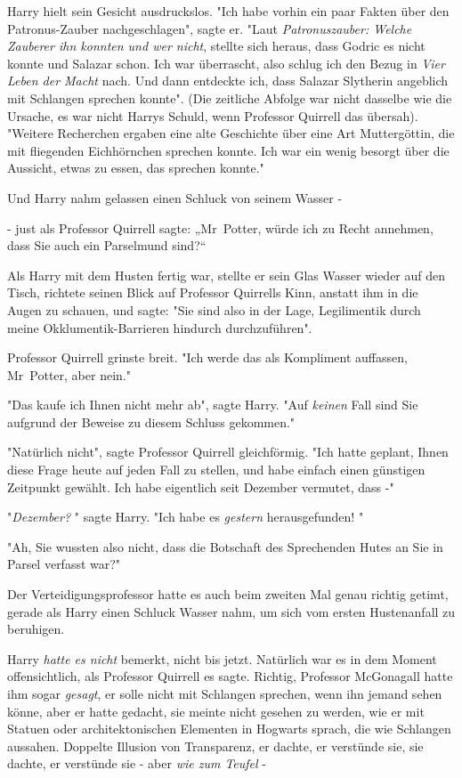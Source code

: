 {Harry hielt sein Gesicht ausdruckslos. "Ich habe vorhin ein paar Fakten über den Patronus-Zauber nachgeschlagen", sagte er. "Laut \emph{Patronuszauber: Welche Zauberer ihn konnten und wer nicht}, stellte sich heraus, dass Godric es nicht konnte und Salazar schon. Ich war überrascht, also schlug ich den Bezug in \emph{Vier Leben der Macht} nach. Und dann entdeckte ich, dass Salazar Slytherin angeblich mit Schlangen sprechen konnte". (Die zeitliche Abfolge war nicht dasselbe wie die Ursache, es war nicht Harrys Schuld, wenn Professor Quirrell das übersah). "Weitere Recherchen ergaben eine alte Geschichte über eine Art Muttergöttin, die mit fliegenden Eichhörnchen sprechen konnte. Ich war ein wenig besorgt über die Aussicht, etwas zu essen, das sprechen konnte."

Und Harry nahm gelassen einen Schluck von seinem Wasser -

- just als Professor Quirrell sagte: „Mr~Potter, würde ich zu Recht annehmen, dass Sie auch ein Parselmund sind?“

Als Harry mit dem Husten fertig war, stellte er sein Glas Wasser wieder auf den Tisch, richtete seinen Blick auf Professor Quirrells Kinn, anstatt ihm in die Augen zu schauen, und sagte: "Sie sind also in der Lage, Legilimentik durch meine Okklumentik-Barrieren hindurch durchzuführen".

Professor Quirrell grinste breit. "Ich werde das als Kompliment auffassen, Mr~Potter, aber nein."

"Das kaufe ich Ihnen nicht mehr ab", sagte Harry. "Auf \emph{keinen} Fall sind Sie aufgrund der Beweise zu diesem Schluss gekommen."

"Natürlich nicht", sagte Professor Quirrell gleichförmig. "Ich hatte geplant, Ihnen diese Frage heute auf jeden Fall zu stellen, und habe einfach einen günstigen Zeitpunkt gewählt. Ich habe eigentlich seit Dezember vermutet, dass -"

"\emph{Dezember?} " sagte Harry. "Ich habe es \emph{gestern} herausgefunden! "

"Ah, Sie wussten also nicht, dass die Botschaft des Sprechenden Hutes an Sie in Parsel verfasst war?"

Der Verteidigungsprofessor hatte es auch beim zweiten Mal genau richtig getimt, gerade als Harry einen Schluck Wasser nahm, um sich vom ersten Hustenanfall zu beruhigen.

Harry \emph{hatte es nicht} bemerkt, nicht bis jetzt. Natürlich war es in dem Moment offensichtlich, als Professor Quirrell es sagte. Richtig, Professor McGonagall hatte ihm sogar \emph{gesagt}, er solle nicht mit Schlangen sprechen, wenn ihn jemand sehen könne, aber er hatte gedacht, sie meinte nicht gesehen zu werden, wie er mit Statuen oder architektonischen Elementen in Hogwarts sprach, die wie Schlangen aussahen. Doppelte Illusion von Transparenz, er dachte, er verstünde sie, sie dachte, er verstünde sie - aber \emph{wie zum Teufel} -

}
